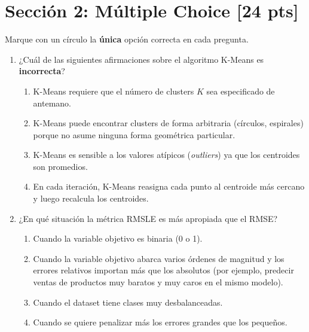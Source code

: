 \documentclass[11pt,a4paper]{article}
\newcommand{\puntaje}[1]{\textbf{[#1 pts]}}
\begin{document}
\vspace{0.5cm}

\section*{Secci\'on 2: M\'ultiple Choice \puntaje{24}}

\noindent Marque con un c\'irculo la \textbf{\'unica} opci\'on correcta en cada pregunta.

\vspace{0.3cm}

\begin{enumerate}[label=\textbf{\arabic*.}, leftmargin=*, itemsep=20pt]

\item ¿Cu\'al de las siguientes afirmaciones sobre el algoritmo K-Means es \textbf{incorrecta}?

\begin{enumerate}[label=\alph*)]
  \item K-Means requiere que el n\'umero de clusters $K$ sea especificado de antemano.
  \item K-Means puede encontrar clusters de forma arbitraria (c\'irculos, espirales) porque no asume ninguna forma geom\'etrica particular.
  \item K-Means es sensible a los valores at\'ipicos (\textit{outliers}) ya que los centroides son promedios.
  \item En cada iteraci\'on, K-Means reasigna cada punto al centroide m\'as cercano y luego recalcula los centroides.
\end{enumerate}

\item ¿En qu\'e situaci\'on la m\'etrica RMSLE es m\'as apropiada que el RMSE?

\begin{enumerate}[label=\alph*)]
  \item Cuando la variable objetivo es binaria (0 o 1).
  \item Cuando la variable objetivo abarca varios \'ordenes de magnitud y los errores relativos importan m\'as que los absolutos (por ejemplo, predecir ventas de productos muy baratos y muy caros en el mismo modelo).
  \item Cuando el dataset tiene clases muy desbalanceadas.
  \item Cuando se quiere penalizar m\'as los errores grandes que los peque\~nos.
\end{enumerate}


\end{enumerate}
\end{document}
